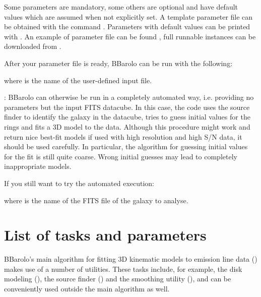 \documentclass[letterpaper,10pt,english]{sphinxmanual}
\begin{document}
Some parameters are mandatory, some others are optional and have default values which are assumed when not explicitly set.
A template parameter file can be obtained with the command . Parameters with default values can be printed with . An example of parameter file can be found , full runnable instances can be downloaded from .

After your parameter file is ready, BBarolo can be run with the following:

\begin{sphinxVerbatim}[commandchars=\\\{\}]
   
\end{sphinxVerbatim}

where  is the name of the user-defined input file.

: BBarolo can otherwise be run in a completely automated way, i.e. providing no parameters but the input FITS datacube. In this case, the code uses the source finder to identify the galaxy in the datacube, tries to guess initial values for the rings and fits a 3D model to the data. Although this procedure might work and return nice best-fit models if used with high resolution and high S/N data, it should be used carefully. In particular, the algorithm for guessing initial values for the fit is still quite coarse. Wrong initial guesses may lead to completely inappropriate models.

If you still want to try the automated execution:

\begin{sphinxVerbatim}[commandchars=\\\{\}]
   
\end{sphinxVerbatim}

where  is the name of the FITS file of the galaxy to analyse.


\chapter{List of tasks and parameters}
\label{\detokenize{tasks::doc}}\label{\detokenize{tasks:list-of-tasks-and-parameters}}\label{\detokenize{tasks:alltasks}}
BBarolo’s main algorithm for fitting 3D kinematic models to emission line data ({\hyperref[\detokenize{tasks:dfit}]{}}) makes use of a number of utilities. These tasks include, for example, the disk modeling ({\hyperref[\detokenize{tasks:galmodtask}]{}}), the source finder ({\hyperref[\detokenize{tasks:searchtask}]{}}) and the smoothing utility ({\hyperref[\detokenize{tasks:smoothtask}]{}}), and can be conveniently used outside the main algorithm as well.
\end{document}
